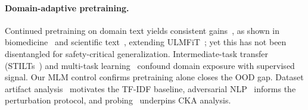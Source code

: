 \paragraph{Domain-adaptive pretraining.}
Continued pretraining on domain text yields consistent gains~\citep{gururangan2020dontstop}, as shown in biomedicine~\citep{lee2020biobert} and scientific text~\citep{beltagy2019scibert}, extending ULMFiT~\citep{howard2018ulmfit}; yet this has not been disentangled for safety-critical generalization. Intermediate-task transfer (STILTs~\citep{phang2018stilts}) and multi-task learning~\citep{caruana1997multitask,liu2019mtdnn} confound domain exposure with supervised signal. Our MLM control confirms pretraining alone closes the OOD gap. Dataset artifact analysis~\citep{gururangan2018artifacts,niven2019probing} motivates the TF-IDF baseline, adversarial NLP~\citep{jin2020textfooler,li2020bertattack,nasr2025attackermovessecond,andriushchenko2024adaptive} informs the perturbation protocol, and probing~\citep{conneau2018probing,hewitt2019structural} underpins CKA analysis.

